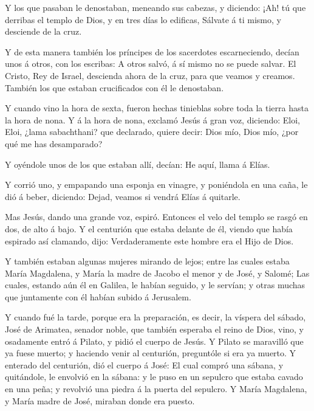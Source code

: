  Y los que pasaban le denostaban, meneando sus cabezas, y
diciendo: ¡Ah! tú que derribas el templo de Dios, y en tres días lo
edificas,  Sálvate á ti mismo, y desciende de la cruz.

 Y de esta manera también los príncipes de los sacerdotes
escarneciendo, decían unos á otros, con los escribas: A otros salvó, á
sí mismo no se puede salvar.  El Cristo, Rey de Israel,
descienda ahora de la cruz, para que veamos y creamos. También los que
estaban crucificados con él le denostaban.

 Y cuando vino la hora de sexta, fueron hechas tinieblas
sobre toda la tierra hasta la hora de nona.  Y á la hora de
nona, exclamó Jesús á gran voz, diciendo: Eloi, Eloi, ¿lama sabachthani?
que declarado, quiere decir: Dios mío, Dios mío, ¿por qué me has
desamparado?

 Y oyéndole unos de los que estaban allí, decían: He aquí,
llama á Elías.

 Y corrió uno, y empapando una esponja en vinagre, y
poniéndola en una caña, le dió á beber, diciendo: Dejad, veamos si
vendrá Elías á quitarle.

 Mas Jesús, dando una grande voz, espiró. 
Entonces el velo del templo se rasgó en dos, de alto á bajo.
 Y el centurión que estaba delante de él, viendo que había
espirado así clamando, dijo: Verdaderamente este hombre era el Hijo de
Dios.

 Y también estaban algunas mujeres mirando de lejos; entre
las cuales estaba María Magdalena, y María la madre de Jacobo el menor y
de José, y Salomé;  Las cuales, estando aún él en Galilea,
le habían seguido, y le servían; y otras muchas que juntamente con él
habían subido á Jerusalem.

 Y cuando fué la tarde, porque era la preparación, es
decir, la víspera del sábado,  José de Arimatea, senador
noble, que también esperaba el reino de Dios, vino, y osadamente entró á
Pilato, y pidió el cuerpo de Jesús.  Y Pilato se maravilló
que ya fuese muerto; y haciendo venir al centurión, preguntóle si era ya
muerto.  Y enterado del centurión, dió el cuerpo á José:
 El cual compró una sábana, y quitándole, le envolvió en la
sábana: y le puso en un sepulcro que estaba cavado en una peña; y
revolvió una piedra á la puerta del sepulcro.  Y María
Magdalena, y María madre de José, miraban donde era puesto.

